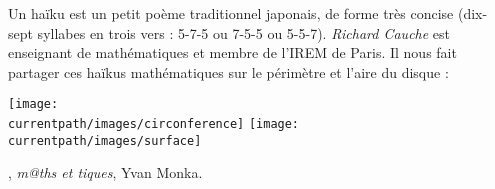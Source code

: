 \vspace*{-7mm}
\begin{changemargin}{-10mm}{-10mm}

\vspace*{-3mm}

\vspace*{-3mm}
\begin{debat}[Haïku]
    \vspace*{-7mm}
    Un haïku est un petit poème traditionnel japonais, de forme très concise (dix-sept syllabes en trois vers : 5-7-5 ou 7-5-5 ou 5-5-7). {\it Richard Cauche} est enseignant de mathématiques et membre de l’IREM de Paris. Il nous fait partager ces haïkus mathématiques sur le périmètre et l'aire du disque :
    \begin{center}
    \texttt{[image: \\currentpath/images/circonference]}
    \hspace{10mm}
    \texttt{[image: \\currentpath/images/surface]}
    \end{center}
    \begin{cadre}[B2][J4]
    \begin{center}
        , {\it m@ths et tiques}, Yvan Monka.
    \end{center}
    \end{cadre}
\end{debat}
\end{changemargin}